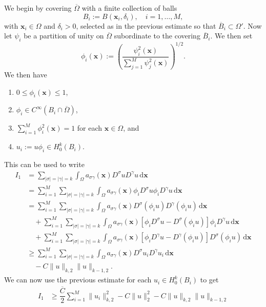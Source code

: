 \begin{Proof}
We begin by covering $\overline\Omega$ with a finite collection of balls
\begin{equation}\label{eq:garding-localization-finite-ball-cover}
B_i:=B(\bm{x}_i,\delta_i),\quad i=1,\ldots,M,
\end{equation}
with $\bm{x}_i\in\Omega$ and $\delta_i>0$, selected as in the previous estimate so that $\overline B_i\subset\Omega\prime$. Now let $\psi_i$ be a partition of unity on $\overline\Omega$ subordinate to the covering $\overline B_i$. We then set
\begin{equation}\label{eq:garding-square-normalized-partition}
\phi_i(\bm{x}):=\left(\dfrac{\psi_i^2(\bm{x})}{\sum_{j=1}^M\psi_j^2(\bm{x})}\right)^{1/2}.
\end{equation}
We then have\begin{enumerate}
\item $0\leq\phi_i(\bm{x})\leq1$,
\item $\phi_i\in C^\infty(B_i\cap\overline\Omega)$,
\item $\sum_{i=1}^M\phi_i^2(\bm{x})=1$ for each $\bm{x}\in\Omega$, and
\item $u_i:=u\phi_i\in H_0^k(B_i)$.
\end{enumerate}This can be used to write\[\begin{aligned}
I_1&=\sum_{|\sigma|=|\gamma|=k}\int_\Omega a_{\sigma\gamma}(\bm{x})D^\sigma uD^\gamma u\,\mathrm{d}\bm{x}\\
&=\sum_{i=1}^M\sum_{|\sigma|=|\gamma|=k}\int_\Omega a_{\sigma\gamma}(\bm{x})\phi_iD^\sigma u\phi_iD^\gamma u\,\mathrm{d}\bm{x}\\
&=\sum_{i=1}^M\sum_{|\sigma|=|\gamma|=k}\int_\Omega a_{\sigma\gamma}(\bm{x})D^\sigma(\phi_i u)D^\gamma(\phi_i u)\,\mathrm{d}\bm{x}\\
&\quad+\sum_{i=1}^M\sum_{|\sigma|=|\gamma|=k}\int_\Omega a_{\sigma\gamma}(\bm{x})[\phi_iD^\sigma u-D^\sigma(\phi_i u)]\phi_iD^\gamma u\,\mathrm{d}\bm{x}\\
&\quad+\sum_{i=1}^M\sum_{|\sigma|=|\gamma|=k}\int_\Omega a_{\sigma\gamma}(\bm{x})[\phi_iD^\gamma u-D^\gamma(\phi_i u)]D^\sigma(\phi_i u)\,\mathrm{d}\bm{x}\\
&\geq\sum_{i=1}^M\sum_{|\sigma|=|\gamma|=k}\int_\Omega a_{\sigma\gamma}(\bm{x})D^\sigma u_iD^\gamma u_i\,\mathrm{d}\bm{x}\\
&\quad-C\|u\|_{k,2}\|u\|_{k-1,2}.
\end{aligned}\]We can now use the previous estimate for each $u_i\in H_0^k(B_i)$ to get\[\begin{aligned}
I_1&\geq\dfrac{\overline C}{2}\sum_{i=1}^M\|u_i\|_{k,2}^2-C\|u\|_2^2-C\|u\|_{k,2}\|u\|_{k-1,2}\\

\end{aligned}\]
\end{Proof}
